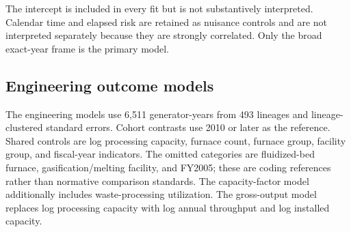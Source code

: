 \documentclass[12pt,letterpaper]{article}
\begin{document}
The intercept is included in every fit but is not substantively interpreted.
Calendar time and elapsed risk are retained as nuisance controls and are not
interpreted separately because they are strongly correlated. Only the broad
exact-year frame is the primary model.

\clearpage
\subsection{Engineering outcome models}

The engineering models use 6,511 generator-years from 493 lineages and
lineage-clustered standard errors. Cohort contrasts use 2010 or later as the
reference. Shared controls are log processing capacity, furnace count, furnace
group, facility group, and fiscal-year indicators. The omitted categories are
fluidized-bed furnace, gasification/melting facility, and FY2005; these are
coding references rather than normative comparison standards. The
capacity-factor model additionally includes waste-processing utilization. The
gross-output model replaces log processing capacity with log annual throughput
and log installed capacity.
\end{document}
